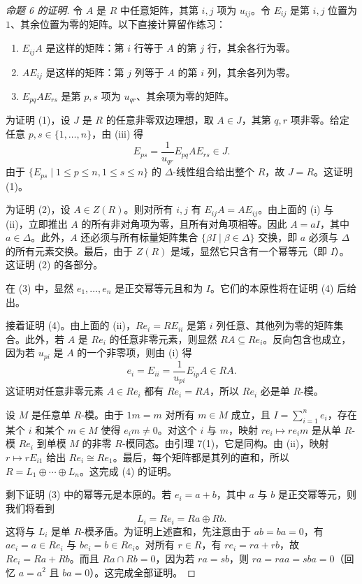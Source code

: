 \begin{proof}[命题 6 的证明]
令 $A$ 是 $R$ 中任意矩阵，其第 $i,j$ 项为 $u_{ij}$。令 $E_{ij}$ 是第 $i,j$ 位置为 $1$、其余位置为零的矩阵。以下直接计算留作练习：
\begin{enumerate}[label=(\roman*)]
  \item $E_{ij}A$ 是这样的矩阵：第 $i$ 行等于 $A$ 的第 $j$ 行，其余各行为零。
  \item $AE_{ij}$ 是这样的矩阵：第 $j$ 列等于 $A$ 的第 $i$ 列，其余各列为零。
  \item $E_{pq}AE_{rs}$ 是第 $p,s$ 项为 $u_{qr}$、其余项为零的矩阵。
\end{enumerate}
为证明 (1)，设 $J$ 是 $R$ 的任意非零双边理想，取 $A\in J$，其第 $q,r$ 项非零。给定任意 $p,s\in\{1,
\ldots,n\}$，由 (iii) 得
\[
  E_{ps}=\frac1{u_{qr}}E_{pq}AE_{rs}\in J.
\]
由于 $\{E_{ps}\mid 1\leq p\leq n,
1\leq s\leq n\}$ 的 $\Delta$-线性组合给出整个 $R$，故 $J=R$。这证明 (1)。

为证明 (2)，设 $A\in Z(R)$。则对所有 $i,j$ 有 $E_{ij}A=AE_{ij}$。由上面的 (i) 与 (ii)，立即推出 $A$ 的所有非对角项为零，且所有对角项相等。因此 $A=aI$，其中 $a\in\Delta$。此外，$A$ 还必须与所有标量矩阵集合 $\{\beta I\mid \beta\in\Delta\}$ 交换，即 $a$ 必须与 $\Delta$ 的所有元素交换。最后，由于 $Z(R)$ 是域，显然它只含有一个幂等元（即 $I$）。这证明 (2) 的各部分。

在 (3) 中，显然 $e_1,
\ldots,e_n$ 是正交幂等元且和为 $I$。它们的本原性将在证明 (4) 后给出。

接着证明 (4)。由上面的 (ii)，$Re_i=RE_{ii}$ 是第 $i$ 列任意、其他列为零的矩阵集合。此外，若 $A$ 是 $Re_i$ 的任意非零元素，则显然 $RA\subseteq Re_i$。反向包含也成立，因为若 $u_{pi}$ 是 $A$ 的一个非零项，则由 (i) 得
\[
  e_i=E_{ii}=\frac1{u_{pi}}E_{ip}A\in RA.
\]
这证明对任意非零元素 $A\in Re_i$ 都有 $Re_i=RA$，所以 $Re_i$ 必是单 $R$-模。

设 $M$ 是任意单 $R$-模。由于 $1m=m$ 对所有 $m\in M$ 成立，且 $I=\sum_{i=1}^n e_i$，存在某个 $i$ 和某个 $m\in M$ 使得 $e_i m\neq0$。对这个 $i$ 与 $m$，映射 $re_i\mapsto re_i m$ 是从单 $R$-模 $Re_i$ 到单模 $M$ 的非零 $R$-模同态。由引理 7(1)，它是同构。由 (ii)，映射 $r\mapsto rE_{i1}$ 给出 $Re_i\cong Re_1$。最后，每个矩阵都是其列的直和，所以 $R=L_1\oplus\cdots\oplus L_n$。这完成 (4) 的证明。

剩下证明 (3) 中的幂等元是本原的。若 $e_i=a+b$，其中 $a$ 与 $b$ 是正交幂等元，则我们将看到
\[
  L_i=Re_i=Ra\oplus Rb.
\]
这将与 $L_i$ 是单 $R$-模矛盾。为证明上述直和，先注意由于 $ab=ba=0$，有 $ae_i=a\in Re_i$ 与 $be_i=b\in Re_i$。对所有 $r\in R$，有 $re_i=ra+rb$，故 $Re_i=Ra+Rb$。而且 $Ra\cap Rb=0$，因为若 $ra=sb$，则 $ra=raa=sba=0$（回忆 $a=a^2$ 且 $ba=0$）。这完成全部证明。
\end{proof}

